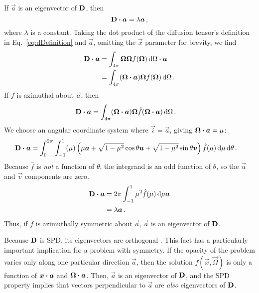 If $\vec{a}$ is an eigenvector of $\mathbf{D}$, then
\begin{equation*}
  \mathbf{D} \bm{\cdot} \bm{a} = \lambda \bm{a}\,,
\end{equation*}
where $\lambda$ is a constant. Taking the dot product of the diffusion tensor's
definition in Eq.~\eqref{eq:dDefinition} and
$\vec{a}$, omitting the $\vec{x}$ parameter for brevity, we find
\begin{align*}
  \mathbf{D} \bm{\cdot} \bm{a}
  &= \int_{4\pi} \bm{\Omega} \bm{\Omega} f(\bm{\Omega}) \mathop{}\!\mathrm{d}\Omega \bm{\cdot} \bm{a}
  \\
  &= \int_{4\pi} (\bm{\Omega} \bm{\cdot} \bm{a}) \bm{\Omega} f(\bm{\Omega}) \mathop{}\!\mathrm{d}\Omega
  \,.
\end{align*}
If $f$ is azimuthal about $\vec{a}$, then
\begin{align*}
  \mathbf{D} \bm{\cdot} \bm{a}
  &= \int_{4\pi} (\bm{\Omega} \bm{\cdot} \bm{a}) \bm{\Omega}
    \hat f(\bm{\Omega} \bm{\cdot} \bm{a}) \mathop{}\!\mathrm{d}\Omega \,.
\end{align*}
We choose an angular coordinate system where $\vec{i}=\vec{a}$, giving
$\bm{\Omega} \bm{\cdot} \bm{a}=\mu$:
\begin{align*}
  \mathbf{D} \bm{\cdot} \bm{a}
  &= \int_{0}^{2\pi} \int_{-1}^{1} (\mu)
  \left( \mu \bm{a} + \sqrt{1-\mu^2} \cos \theta \bm{u} + \sqrt{1-\mu^2} \sin
  \theta \bm{v} \right) \hat f(\mu) \mathop{}\!\mathrm{d}\mu \mathop{}\!\mathrm{d}\theta \,.
\end{align*}
Because $\hat f$ is \emph{not} a function of $\theta$, the integrand is an
odd function of $\theta$, so the $\vec{u}$ and $\vec{v}$ components are zero.
\begin{align*}
  \mathbf{D} \bm{\cdot} \bm{a}
  &= 2\pi \int_{-1}^{1} \mu^2 \hat f(\mu) \mathop{}\!\mathrm{d}\mu \bm{a}
  \\
  &= \lambda \bm{a} \,.
\end{align*}
Thus, if $f$ is azimuthally symmetric about $\vec{a}$, $\vec{a}$ is an
eigenvector of $\mathbf{D}$.

Because $\mathbf{D}$ is SPD, its eigenvectors are orthogonal \cite[p.173]{Tre1997}.
This fact has a particularly important implication for a problem with symmetry.
If the opacity of the problem varies only along one particular direction
$\vec{a}$, then the
solution $f(\vec{x},\vec{\Omega})$ is only a function of $\bm{x}\bm{\cdot} \bm{a}$
and $\bm{\Omega} \bm{\cdot} \bm{a}$. Then, $\vec{a}$ is an eigenvector of $\mathbf{D}$,
and the SPD property implies that vectors perpendicular to $\vec{a}$ are \emph{also}
eigenvectors of $\mathbf{D}$.

